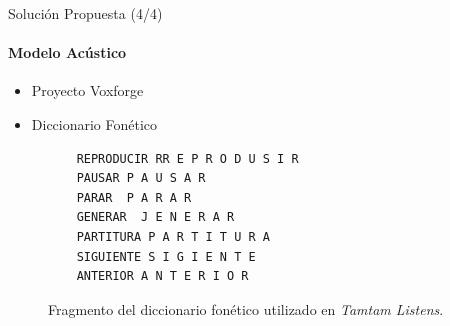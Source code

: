 \begin{frame}[fragile]{Soluci\'on Propuesta (4/4)}
\framesubtitle{Modelo Acústico}
\begin{itemize}
    \item Proyecto Voxforge
    \item Diccionario Fonético    
\end{itemize}

    \begin{figure}[H]
    \begin{lstlisting}
    REPRODUCIR RR E P R O D U S I R
    PAUSAR P A U S A R
    PARAR  P A R A R
    GENERAR  J E N E R A R
    PARTITURA P A R T I T U R A
    SIGUIENTE S I G I E N T E
    ANTERIOR A N T E R I O R
    \end{lstlisting}
    \caption{Fragmento del diccionario fon\'etico utilizado en \emph{Tamtam Listens}.}
    \label{figure:fragmento-dic}
\end{figure}

\end{frame}

